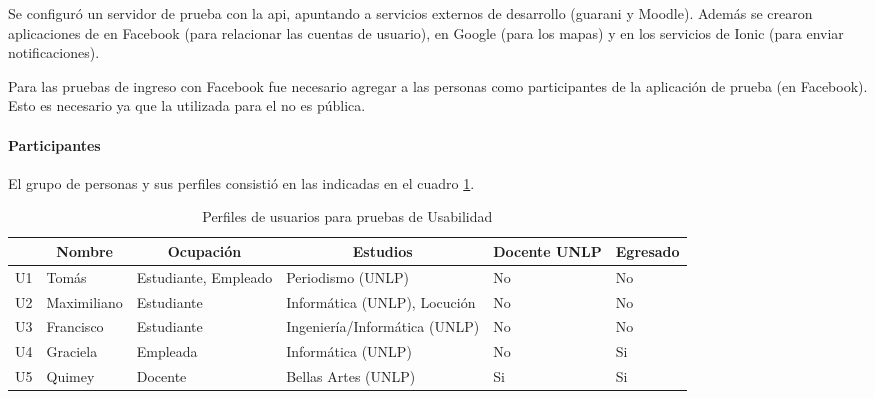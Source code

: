 Se configuró un servidor de prueba con la \gls{api}, apuntando a servicios externos de desarrollo (\gls{guarani} y Moodle). Además se crearon aplicaciones de  en Facebook (para relacionar las cuentas de usuario), en Google (para los mapas) y en los servicios de Ionic (para enviar notificaciones).

Para las pruebas de ingreso con Facebook fue necesario agregar a las personas como participantes de la aplicación de prueba (en Facebook). Esto es necesario ya que la utilizada para el  no es pública.

\paragraph{Participantes}
\label{desarrollo_pruebas_usabilidad_preparativos_participantes}

El grupo de personas y sus perfiles consistió en las indicadas en el cuadro \ref{perfiles_usabilidad}.

\begin{table}[htbp]
\centering
\caption{Perfiles de usuarios para pruebas de Usabilidad}
\label{perfiles_usabilidad}
\begin{tabular}{|l|l|p{2.5cm}|p{2.5cm}|p{2cm}|l|}
\hline
   & \multicolumn{1}{c|}{\textbf{Nombre}} & \multicolumn{1}{c|}{\textbf{Ocupación}} & \multicolumn{1}{c|}{\textbf{Estudios}} & \textbf{Docente UNLP} & \textbf{Egresado} \\ \hline
U1 & Tomás                                & Estudiante, Empleado                    & Periodismo (UNLP)                      & No                    & No                \\ \hline
U2 & Maximiliano\footnotemark{}                          & Estudiante                              & Informática (UNLP), Locución           & No                    & No                \\ \hline
U3 & Francisco                                     & Estudiante                              & Ingeniería/Informática (UNLP)          & No                    & No                \\ \hline
U4 & Graciela                             & Empleada                                & Informática (UNLP)                     & No                    & Si                \\ \hline
U5 & Quimey                               & Docente                                 & Bellas Artes (UNLP)                    & Si                    & Si                \\ \hline
\end{tabular}
\end{table}

